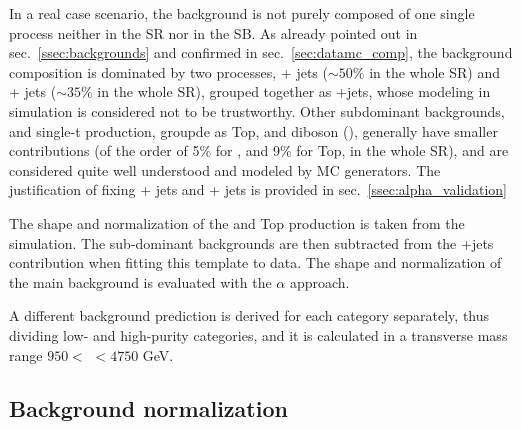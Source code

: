 \noindent In a real case scenario, the background is not purely composed of one single process neither in the SR nor in the SB. As already pointed out in sec.~\ref{ssec:backgrounds} and confirmed in sec.~\ref{sec:datamc_comp}, the background composition is dominated by two processes, \Z + jets ($\sim 50\%$ in the whole SR) and \W + jets ($\sim 35\%$ in the whole SR), grouped together as \V+jets, whose modeling in simulation is considered not to be trustworthy. Other subdominant backgrounds, \ttbar and single-t production, groupde as Top, and diboson (\VV), generally have smaller contributions (of the order of 5\% for \VV, and 9\% for Top, in the whole SR), and are considered quite well understood and modeled by MC generators. The justification of fixing \W + jets and \Z + jets is provided in sec.~\ref{ssec:alpha_validation}

\noindent The shape and normalization of the \VV and Top production is taken from the simulation. The sub-dominant backgrounds are then subtracted from the \V+jets contribution when fitting this template to data. The shape and normalization of the main background is evaluated with the $\alpha$ approach.


\noindent A different background prediction is derived for each category separately, thus dividing low- and high-purity categories, and it is calculated in a transverse mass range $950 <$ \mtVZ $<4750$ GeV.

\subsection{Background normalization}\label{ssec:alphaNorm}


